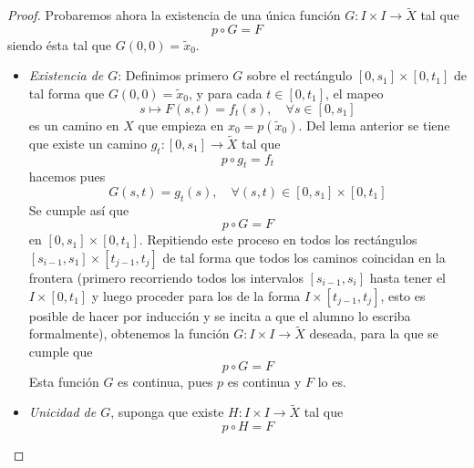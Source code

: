 \documentclass{article}
\theoremstyle{largebreak}
\newcommand\cf[3]{\ensuremath{#1:#2\rightarrow#3}}
\begin{document}
\begin{proof}
        Probaremos ahora la existencia de una única función $\cf{G}{I\times I}{\widetilde{X}}$ tal que
        \begin{equation*}
            p\circ G=F
        \end{equation*}
        siendo ésta tal que $G(0,0)=\widetilde{x}_0$.
        \begin{itemize}
            \item \textit{Existencia de $G$}: Definimos primero $G$ sobre el rectángulo $[0,s_1]\times[0,t_1]$ de tal forma que $G(0,0)=\widetilde{x}_0$, y para cada $t\in [0,t_1]$, el mapeo
            \begin{equation*}
                s\mapsto F(s,t)=f_t(s),\quad\forall s\in[0,s_1]
            \end{equation*}
            es un camino en $X$ que empieza en $x_0=p(\widetilde{x}_0)$. Del lema anterior se tiene que existe un camino $\cf{g_t}{[0,s_1]}{\widetilde{X}}$ tal que
            \begin{equation*}
                p\circ g_t=f_t
            \end{equation*}
            hacemos pues
            \begin{equation*}
                G(s,t)=g_t(s),\quad\forall (s,t)\in[0,s_1]\times[0,t_1]
            \end{equation*}
            Se cumple así que
            \begin{equation*}
                p\circ G=F
            \end{equation*}
            en $[0,s_1]\times [0,t_1]$. Repitiendo este proceso en todos los rectángulos $[s_{ i-1},s_1]\times[t_{ j-1},t_j]$ de tal forma que todos los caminos coincidan en la frontera (primero recorriendo todos los intervalos $[s_{ i-1},s_i]$ hasta tener el $I\times[0,t_1]$ y luego proceder para los de la forma $I\times[t_{ j-1},t_j]$, esto es posible de hacer por inducción y se incita a que el alumno lo escriba formalmente), obtenemos la función $\cf{G}{I\times I}{\widetilde{X}}$ deseada, para la que se cumple que
            \begin{equation*}
                p\circ G=F
            \end{equation*}
            Esta función $G$ es continua, pues $p$ es continua y $F$ lo es.
            \item \textit{Unicidad de $G$}, suponga que existe $\cf{H}{I\times I}{\widetilde{X}}$ tal que
            \begin{equation*}
                p\circ H=F
            \end{equation*}

\end{itemize}
\end{proof}
\end{document}
